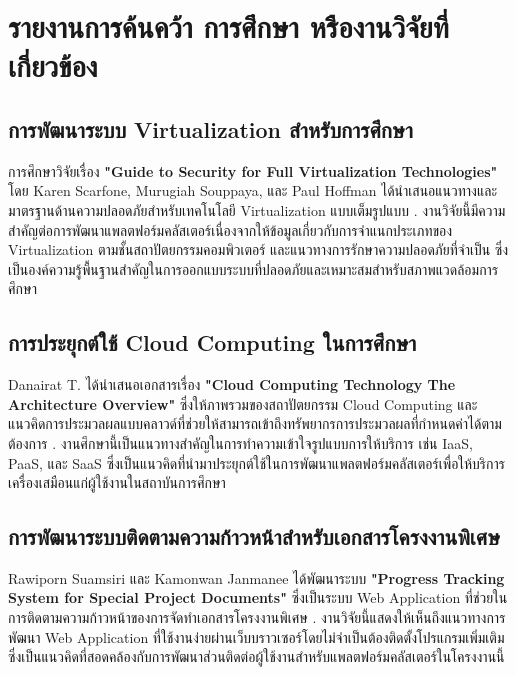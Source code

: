\section{รายงานการค้นคว้า การศึกษา หรืองานวิจัยที่เกี่ยวข้อง}

\subsection{การพัฒนาระบบ Virtualization สำหรับการศึกษา}
\hspace*{1.5em} %
การศึกษาวิจัยเรื่อง \textbf{"Guide to Security for Full Virtualization Technologies"} โดย Karen Scarfone, Murugiah Souppaya, และ Paul Hoffman ได้นำเสนอแนวทางและมาตรฐานด้านความปลอดภัยสำหรับเทคโนโลยี Virtualization แบบเต็มรูปแบบ \parencite{GuideToSecurityforFullVT}. งานวิจัยนี้มีความสำคัญต่อการพัฒนาแพลตฟอร์มคลัสเตอร์เนื่องจากให้ข้อมูลเกี่ยวกับการจำแนกประเภทของ Virtualization ตามชั้นสถาปัตยกรรมคอมพิวเตอร์ และแนวทางการรักษาความปลอดภัยที่จำเป็น ซึ่งเป็นองค์ความรู้พื้นฐานสำคัญในการออกแบบระบบที่ปลอดภัยและเหมาะสมสำหรับสภาพแวดล้อมการศึกษา

\subsection{การประยุกต์ใช้ Cloud Computing ในการศึกษา}
\hspace*{1.5em} %
Danairat T. ได้นำเสนอเอกสารเรื่อง \textbf{"Cloud Computing Technology The Architecture Overview"} ซึ่งให้ภาพรวมของสถาปัตยกรรม Cloud Computing และแนวคิดการประมวลผลแบบคลาวด์ที่ช่วยให้สามารถเข้าถึงทรัพยากรการประมวลผลที่กำหนดค่าได้ตามต้องการ \parencite{CloudComputingTechnologyTheArch}. งานศึกษานี้เป็นแนวทางสำคัญในการทำความเข้าใจรูปแบบการให้บริการ เช่น IaaS, PaaS, และ SaaS ซึ่งเป็นแนวคิดที่นำมาประยุกต์ใช้ในการพัฒนาแพลตฟอร์มคลัสเตอร์เพื่อให้บริการเครื่องเสมือนแก่ผู้ใช้งานในสถาบันการศึกษา

\subsection{การพัฒนาระบบติดตามความก้าวหน้าสำหรับเอกสารโครงงานพิเศษ}
\hspace*{1.5em} %
Rawiporn Suamsiri และ Kamonwan Janmanee ได้พัฒนาระบบ \textbf{"Progress Tracking System for Special Project Documents"} ซึ่งเป็นระบบ Web Application ที่ช่วยในการติดตามความก้าวหน้าของการจัดทำเอกสารโครงงานพิเศษ \parencite{suamsiri2024_progress_tracking}. งานวิจัยนี้แสดงให้เห็นถึงแนวทางการพัฒนา Web Application ที่ใช้งานง่ายผ่านเว็บบราวเซอร์โดยไม่จำเป็นต้องติดตั้งโปรแกรมเพิ่มเติม ซึ่งเป็นแนวคิดที่สอดคล้องกับการพัฒนาส่วนติดต่อผู้ใช้งานสำหรับแพลตฟอร์มคลัสเตอร์ในโครงงานนี้

